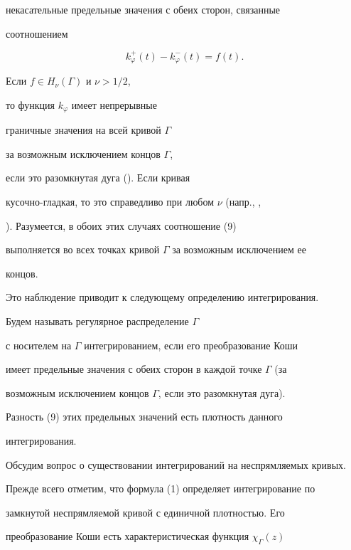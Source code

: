 некасательные предельные значения с обеих сторон, связанные 


соотношением 


\begin{equation} 


k^+_\varphi(t)-k^-_\varphi(t)=f(t). 


\end{equation} 


Если $f\in H_\nu(\Gamma)$ и $\nu>1/2$, 


то функция $k_\varphi$ имеет непрерывные 


граничные значения на всей кривой $\Gamma$ 


за возможным исключением концов $\Gamma$, 


если это разомкнутая дуга (\cite{13}). Если кривая 


кусочно-гладкая, то это справедливо при любом $\nu$ (напр., \cite{14}, 


\cite{15}). Разумеется, в обоих этих случаях соотношение (9)  


выполняется во всех точках кривой $\Gamma$ за возможным исключением ее 


концов. 


Это наблюдение приводит к следующему определению интегрирования. 


 


\begin{defn} Будем называть регулярное распределение $\Gamma$ 


с носителем на $\Gamma$ интегрированием, если его преобразование Коши 


имеет предельные значения с обеих сторон в каждой точке $\Gamma$ (за 


возможным исключением концов $\Gamma$, если это разомкнутая дуга). 


Разность (9) этих предельных значений есть плотность данного  


интегрирования.


\end{defn} 


 


Обсудим вопрос о существовании интегрирований на неспрямляемых кривых. 


Прежде всего отметим, что формула (1) определяет интегрирование по 


замкнутой неспрямляемой кривой с единичной плотностью. Его 


преобразование Коши есть характеристическая функция $\chi_\Gamma(z)$ 


